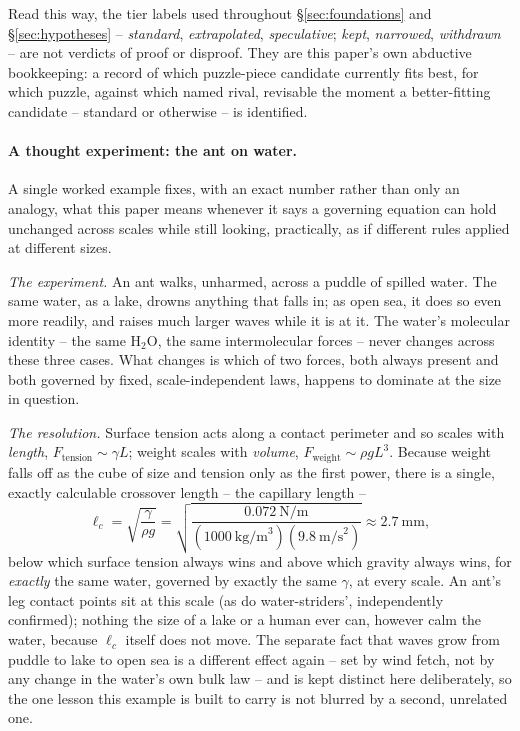 \documentclass[12pt, a4paper]{article}
\begin{document}
Read this way, the tier labels used throughout
\S\ref{sec:foundations} and \S\ref{sec:hypotheses} --
\emph{standard}, \emph{extrapolated}, \emph{speculative}; \emph{kept},
\emph{narrowed}, \emph{withdrawn} -- are not verdicts of proof or
disproof. They are this paper's own abductive bookkeeping: a record of
which puzzle-piece candidate currently fits best, for which puzzle,
against which named rival, revisable the moment a better-fitting
candidate -- standard or otherwise -- is identified.

\paragraph{A thought experiment: the ant on water.}
A single worked example fixes, with an exact number rather than only
an analogy, what this paper means whenever it says a governing
equation can hold unchanged across scales while still looking,
practically, as if different rules applied at different sizes.

\emph{The experiment.} An ant walks, unharmed, across a puddle of
spilled water. The same water, as a lake, drowns anything that falls
in; as open sea, it does so even more readily, and raises much larger
waves while it is at it. The water's molecular identity -- the same
H$_2$O, the same intermolecular forces -- never changes across these
three cases. What changes is which of two forces, both always
present and both governed by fixed, scale-independent laws, happens
to dominate at the size in question.

\emph{The resolution.} Surface tension acts along a contact
perimeter and so scales with \emph{length}, $F_{\text{tension}}\sim
\gamma L$; weight scales with \emph{volume}, $F_{\text{weight}}\sim
\rho g L^3$. Because weight falls off as the cube of size and tension
only as the first power, there is a single, exactly calculable
crossover length -- the capillary length --
\[
  \ell_c=\sqrt{\frac{\gamma}{\rho g}}
       =\sqrt{\frac{0.072\ \text{N/m}}{(1000\ \text{kg/m}^3)(9.8\ \text{m/s}^2)}}
       \approx 2.7\ \text{mm},
\]
below which surface tension always wins and above which gravity
always wins, for \emph{exactly} the same water, governed by exactly
the same $\gamma$, at every scale. An ant's leg contact points sit at
this scale (as do water-striders', independently confirmed); nothing
the size of a lake or a human ever can, however calm the water,
because $\ell_c$ itself does not move. The separate fact that waves
grow from puddle to lake to open sea is a different effect again --
set by wind fetch, not by any change in the water's own bulk law --
and is kept distinct here deliberately, so the one lesson this
example is built to carry is not blurred by a second, unrelated one.
\end{document}
